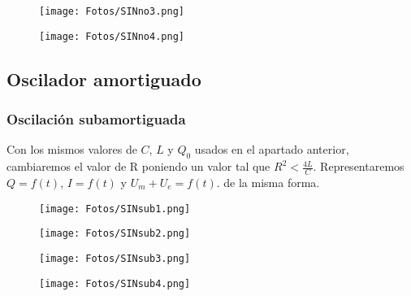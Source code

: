 \documentclass{article}
\begin{document}
    \begin{figure}[h]
        \centering
        \begin{minipage}{.5\textwidth}
            \centering
            \texttt{[image: Fotos/SINno3.png]}
        \end{minipage}%
        \begin{minipage}{.5\textwidth}
            \centering
            \texttt{[image: Fotos/SINno4.png]}
        \end{minipage}
    \end{figure}
    
\clearpage

    \subsection{Oscilador amortiguado}
        \vspace{0.4cm}
        \subsubsection{Oscilación subamortiguada}
        Con los mismos valores de $C$, $L$ y $Q_0$ usados en el apartado anterior, cambiaremos el valor de R poniendo un valor tal que $R^2 < \frac{4L}{C}$. Representaremos $Q=f(t)$, $I=f(t)$ y $U_m+U_e=f(t)$. de la misma forma. 
        
        \vspace{1.5cm}
        \begin{figure}[h]
            \centering
            \begin{minipage}{.5\textwidth}
                \centering
                \texttt{[image: Fotos/SINsub1.png]}
            \end{minipage}%
            \begin{minipage}{.5\textwidth}
                \centering
                \texttt{[image: Fotos/SINsub2.png]}
            \end{minipage}
        \end{figure}
        
        \vspace{0.4cm}
        \begin{figure}[h]
            \centering
            \begin{minipage}{.5\textwidth}
                \centering
                \texttt{[image: Fotos/SINsub3.png]}
            \end{minipage}%
            \begin{minipage}{.5\textwidth}
                \centering
                \texttt{[image: Fotos/SINsub4.png]}
            \end{minipage}
        \end{figure}
\end{document}
